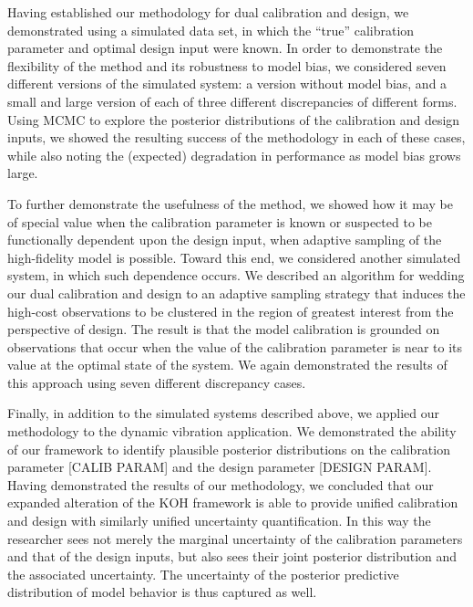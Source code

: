 \documentclass[10pt,a4paper]{article}
\begin{document}
Having established our methodology for dual calibration and design, we demonstrated using a simulated data set, in which the ``true'' calibration parameter and optimal design input were known.
In order to demonstrate the flexibility of the method and its robustness to model bias, we considered seven different versions of the simulated system: a version without model bias, and a small and large version of each of three different discrepancies of different forms.
Using MCMC to explore the posterior distributions of the calibration and design inputs, we showed the resulting success of the methodology in each of these cases, while also noting the (expected) degradation in performance as model bias grows large.

To further demonstrate the usefulness of the method, we showed how it may be of special value when the calibration parameter is known or suspected to be functionally dependent upon the design input, when adaptive sampling of the high-fidelity model is possible.
Toward this end, we considered another simulated system, in which such dependence occurs.
We described an algorithm for wedding our dual calibration and design to an adaptive sampling strategy that induces the high-cost observations to be clustered in the region of greatest interest from the perspective of design.
The result is that the model calibration is grounded on observations that occur when the value of the calibration parameter is near to its value at the optimal state of the system.
We again demonstrated the results of this approach using seven different discrepancy cases.

Finally, in addition to the simulated systems described above, we applied our methodology to the dynamic vibration application.
We demonstrated the ability of our framework to identify plausible posterior distributions on the calibration parameter [CALIB PARAM] and the design parameter [DESIGN PARAM].
Having demonstrated the results of our methodology, we concluded that our expanded alteration of the KOH framework is able to provide unified calibration and design with similarly unified uncertainty quantification.
In this way the researcher sees not merely the marginal uncertainty of the calibration parameters and that of the design inputs, but also sees their joint posterior distribution and the associated uncertainty.
The uncertainty of the posterior predictive distribution of model behavior is thus captured as well.





	
\end{document}
